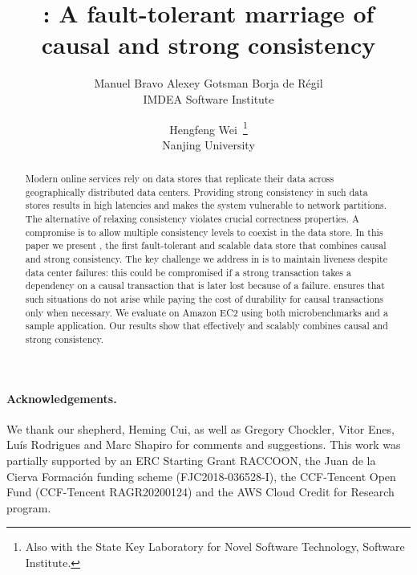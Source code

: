 \documentclass[letterpaper,twocolumn,10pt, usenames,dvipsnames]{article}
\newif\iflong
\begin{document}
\title{\System: A fault-tolerant marriage of causal and strong consistency}

\author{
{\rm Manuel Bravo} \qquad
{\rm Alexey Gotsman} \qquad
{\rm Borja de R\'egil} \qquad
\\[2pt]
IMDEA Software Institute
\and
\and
{\rm Hengfeng Wei~\thanks{Also with the State Key Laboratory for Novel Software Technology, Software Institute.}}\\[2pt]
Nanjing University
}

\maketitle

\begin{abstract}
Modern online services rely on data stores that replicate their data across
geographically distributed data centers. %
Providing strong consistency in such data stores results in high latencies and
makes the system vulnerable to network partitions.
The alternative of relaxing consistency violates crucial correctness properties.
A compromise is to allow multiple consistency levels to
coexist in the data store. In this paper we present \System, the first fault-tolerant and
scalable data store that combines causal and strong consistency.
The key challenge we address in \System is to maintain liveness despite data
center failures: this could be compromised if a strong transaction takes a
dependency on a causal transaction that is later lost because of a failure.
\System ensures that such situations do not arise while paying the cost of
durability for causal transactions only when necessary.
We evaluate \System on Amazon EC2 using both microbenchmarks and a
sample application. Our results show that
\System effectively and scalably combines causal and strong
consistency.

\end{abstract}












\paragraph{Acknowledgements.}
We thank our shepherd, Heming Cui, as well as Gregory Chockler, Vitor Enes, Luís
Rodrigues and Marc Shapiro for comments and suggestions. This work was partially
supported by an ERC Starting Grant RACCOON, the Juan de la Cierva Formaci\'on
funding scheme (FJC2018-036528-I), the CCF-Tencent Open Fund (CCF-Tencent
RAGR20200124) and the AWS Cloud Credit for Research program.





\iflong
\clearpage
\appendix


\fi
\end{document}
